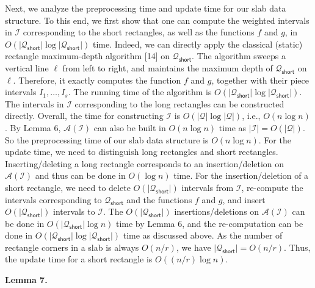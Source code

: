 \documentclass[10pt,a4paper]{article}
\begin{document}
\par
\par
Next, we analyze the preprocessing time and update time for our slab data structure. To this end, we first show that one can compute the weighted intervals in $\mathcal{I}$ corresponding to the short rectangles, as well as the functions $f$ and $g$, in $O(|\mathcal{Q}_{\mathsf{short}}|\log|\mathcal{Q}_{\mathsf{short}}|)$ time. Indeed, we can directly apply the classical (static) rectangle maximum-depth algorithm [14] on $\mathcal{Q}_{\mathsf{short}}$. The algorithm sweeps a vertical line $\ell$ from left to right, and maintains the maximum depth of $\mathcal{Q}_{\mathsf{short}}$ on $\ell$. Therefore, it exactly computes the function $f$ and $g$, together with their piece intervals $I_{1},\dots,I_{s}$. The running time of the algorithm is $O(|\mathcal{Q}_{\mathsf{short}}|\log|\mathcal{Q}_{\mathsf{short}}|)$. The intervals in $\mathcal{I}$ corresponding to the long rectangles can be constructed directly. Overall, the time for constructing $\mathcal{I}$ is $O(|\mathcal{Q}|\log|\mathcal{Q}|)$, i.e., $O(n\log n)$. By Lemma 6, $\mathcal{A}(\mathcal{I})$ can also be built in $O(n\log n)$ time as $|\mathcal{I}|=O(|\mathcal{Q}|)$. So the preprocessing time of our slab data structure is $O(n\log n)$. For the update time, we need to distinguish long rectangles and short rectangles. Inserting/deleting a long rectangle corresponds to an insertion/deletion on $\mathcal{A}(\mathcal{I})$ and thus can be done in $O(\log n)$ time. For the insertion/deletion of a short rectangle, we need to delete $O(|\mathcal{Q}_{\mathsf{short}}|)$ intervals from $\mathcal{I}$, re-compute the intervals corresponding to $\mathcal{Q}_{\mathsf{short}}$ and the functions $f$ and $g$, and insert $O(|\mathcal{Q}_{\mathsf{short}}|)$ intervals to $\mathcal{I}$. The $O(|\mathcal{Q}_{\mathsf{short}}|)$ insertions/deletions on $\mathcal{A}(\mathcal{I})$ can be done in $O(|\mathcal{Q}_{\mathsf{short}}|\log n)$ time by Lemma 6, and the re-computation can be done in $O(|\mathcal{Q}_{\mathsf{short}}|\log|\mathcal{Q}_{\mathsf{short}}|)$ time as discussed above. As the number of rectangle corners in a slab is always $O(n/r)$, we have $|\mathcal{Q}_{\mathsf{short}}|=O(n/r)$. Thus, the update time for a short rectangle is $O((n/r)\log n)$.
\par
\par
\par\medskip\noindent\textbf{Lemma 7.}\par
\end{document}
